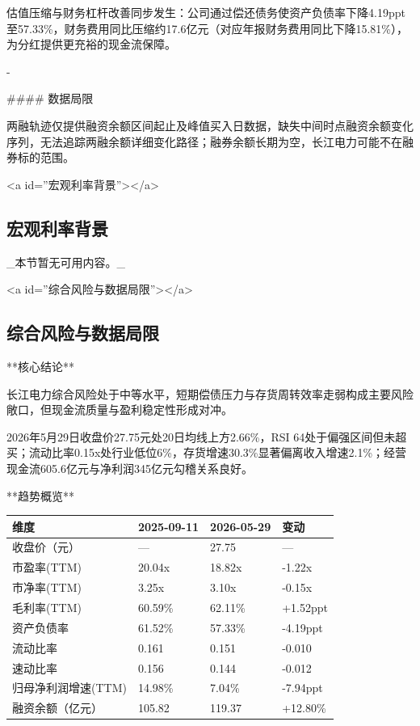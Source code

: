 \documentclass[12pt,a4paper]{article}
\begin{document}
估值压缩与财务杠杆改善同步发生：公司通过偿还债务使资产负债率下降4.19ppt至57.33\%，财务费用同比压缩约17.6亿元（对应年报财务费用同比下降15.81\%），为分红提供更充裕的现金流保障。

-

\#\#\#\# 数据局限

两融轨迹仅提供融资余额区间起止及峰值买入日数据，缺失中间时点融资余额变化序列，无法追踪两融余额详细变化路径；融券余额长期为空，长江电力可能不在融券标的范围。

<a id=''宏观利率背景''></a>

\subsection{ 宏观利率背景}

\_本节暂无可用内容。\_

<a id=''综合风险与数据局限''></a>

\subsection{ 综合风险与数据局限}

**核心结论**

长江电力综合风险处于中等水平，短期偿债压力与存货周转效率走弱构成主要风险敞口，但现金流质量与盈利稳定性形成对冲。

2026年5月29日收盘价27.75元处20日均线上方2.66\%，RSI 64处于偏强区间但未超买；流动比率0.15x处行业低位6\%，存货增速30.3\%显著偏离收入增速2.1\%；经营现金流605.6亿元与净利润345亿元勾稽关系良好。

**趋势概览**

\begin{table}[htbp]
\centering
\begin{tabular}{llll}
\toprule
维度 & 2025-09-11 & 2026-05-29 & 变动 \\
\midrule
收盘价（元） & — & 27.75 & — \\
市盈率(TTM) & 20.04x & 18.82x & -1.22x \\
市净率(TTM) & 3.25x & 3.10x & -0.15x \\
毛利率(TTM) & 60.59\% & 62.11\% & +1.52ppt \\
资产负债率 & 61.52\% & 57.33\% & -4.19ppt \\
流动比率 & 0.161 & 0.151 & -0.010 \\
速动比率 & 0.156 & 0.144 & -0.012 \\
归母净利润增速(TTM) & 14.98\% & 7.04\% & -7.94ppt \\
融资余额（亿元） & 105.82 & 119.37 & +12.80\% \\
\bottomrule
\end{tabular}
\end{table}
\end{document}
